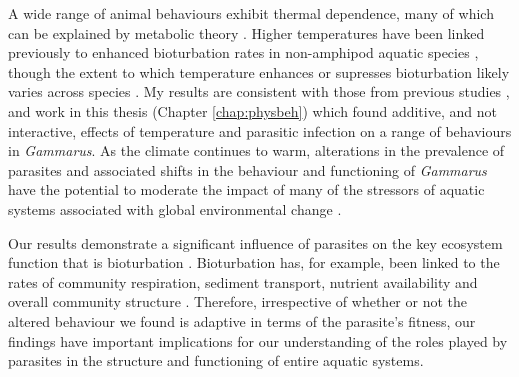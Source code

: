A wide range of animal behaviours exhibit thermal dependence, many of which can be explained by metabolic theory \citep{kordas2011, dell2014}. Higher temperatures have been linked previously to enhanced bioturbation rates in non-amphipod aquatic species \citep{ouellette2004}, though the extent to which temperature enhances or supresses bioturbation likely varies across species \citep{maire2010}. My results are consistent with those from previous studies \citep{labaude2016}, and work in this thesis (Chapter \ref{chap:physbeh}) which found additive, and not interactive, effects of temperature and parasitic infection on a range of behaviours in \emph{Gammarus}. As the climate continues to warm, alterations in the prevalence of parasites and associated shifts in the behaviour and functioning of \emph{Gammarus} have the potential to moderate the impact of many of the stressors of aquatic systems associated with global environmental change \citep{baranov2016}. 

Our results demonstrate a significant influence of parasites on the key ecosystem function that is bioturbation \citep{vannatta2018}. Bioturbation has, for example, been linked to the rates of community respiration, sediment transport, nutrient availability \citep{ouellette2004, wohlgemuth2017} and overall community structure \citep{grant1994, croel2011, baranov2016}. Therefore, irrespective of whether or not the altered behaviour we found is adaptive in terms of the parasite’s fitness, our findings have important implications for our understanding of the roles played by parasites in the structure and functioning of entire aquatic systems.